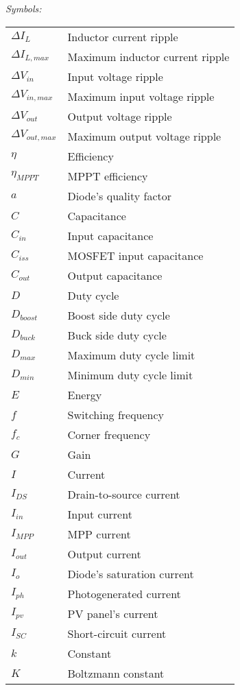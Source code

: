 \vspace{5mm} %
\newpage
\noindent\textit{Symbols:}\newline
\begin{tabular}{ll}
$\Delta I_{L}$ & Inductor current ripple\\
$\Delta I_{L,max}$ & Maximum inductor current ripple\\
$\Delta V_{in}$ & Input voltage ripple\\
$\Delta V_{in,max}$ & Maximum input voltage ripple\\
$\Delta V_{out}$ & Output voltage ripple\\
$\Delta V_{out,max}$ & Maximum output voltage ripple\\
$\eta$ & Efficiency\\
$\eta_{MPPT}$ & MPPT efficiency\\
$a$ & Diode's quality factor \\
$C$ & Capacitance\\
$C_{in}$ & Input capacitance\\
$C_{iss}$ & MOSFET input capacitance \\ 
$C_{out}$ & Output capacitance\\
$D$ & Duty cycle\\
$D_{boost}$ & Boost side duty cycle\\
$D_{buck}$ & Buck side duty cycle\\
$D_{max}$  & Maximum duty cycle limit \\
$D_{min}$  & Minimum duty cycle limit \\ 
$E$ & Energy\\
$f$ & Switching frequency\\
$f_{c}$ & Corner frequency \\
$G$ & Gain \\
$I$ & Current\\
$I_{DS}$ & Drain-to-source current \\
$I_{in}$ & Input current \\
$I_{MPP}$ & MPP current\\
$I_{out}$ & Output current \\
$I_{o}$ & Diode's saturation current \\
$I_{ph}$ & Photogenerated current \\
$I_{pv}$ & PV panel's current \\
$I_{SC}$ & Short-circuit current\\
$k$ & Constant \\
$K$ & Boltzmann constant \\

\end{tabular}
